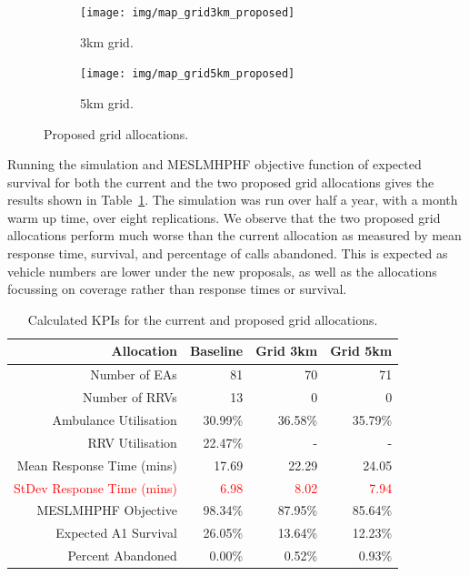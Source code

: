 \documentclass[numbers,webpdf,imaman]{ima-authoring-template}%
\begin{document}
\begin{figure}
\begin{center}
\begin{subfigure}{0.37\textwidth}
\texttt{[image: img/map\_grid3km\_proposed]}
\caption{3km grid.}
\end{subfigure}
\hspace{8mm}
\begin{subfigure}{0.37\textwidth}
\texttt{[image: img/map\_grid5km\_proposed]}
\caption{5km grid.}
\end{subfigure}
\caption{Proposed grid allocations.}
\label{fig:grid_allocations}
\end{center}
\end{figure}

Running the simulation and MESLMHPHF objective function of expected survival for
both the current and the two proposed grid allocations gives the results shown
in Table~\ref{tbl:current_grid_results}. The simulation was run over half a
year, with a month warm up time, over eight replications. We observe that the
two proposed grid allocations perform much worse than the current allocation as
measured by mean response time, survival, and percentage of calls abandoned.
This is expected as vehicle numbers are lower under the new proposals, as well
as the allocations focussing on coverage rather than response times or survival.

\begin{table}
\begin{tabular}{rrrr}
\toprule
Allocation & Baseline & Grid 3km & Grid 5km \\
\midrule
Number of EAs & 81 & 70 & 71 \\
Number of RRVs & 13 & 0 & 0 \\
Ambulance Utilisation & 30.99\% & 36.58\% & 35.79\% \\
RRV Utilisation & 22.47\% & - & - \\
Mean Response Time (mins) & 17.69 & 22.29 & 24.05 \\
\textcolor{red}{StDev Response Time (mins)} & \textcolor{red}{6.98} & \textcolor{red}{8.02} & \textcolor{red}{7.94} \\
MESLMHPHF Objective & 98.34\% & 87.95\% & 85.64\% \\
Expected A1 Survival & 26.05\% & 13.64\% & 12.23\% \\
Percent Abandoned & 0.00\% & 0.52\% & 0.93\% \\
\bottomrule
\end{tabular}
\caption{Calculated KPIs for the current and proposed grid allocations.}
\label{tbl:current_grid_results}
\end{table}
\end{document}

